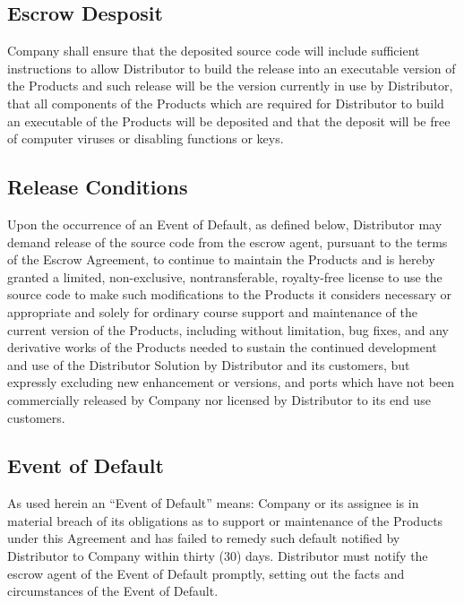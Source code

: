 \documentclass[letterpaper,10pt,english]{sphinxmanual}
\begin{document}
\subsection{Escrow Desposit}
\label{\detokenize{escrow:escrow-desposit}}
Company shall ensure that the deposited source code will include sufficient instructions to allow Distributor to build the release into an executable version of the Products and such release will be the version currently in use by Distributor, that all components of the Products which are required for Distributor to build an executable of the Products will be deposited and that the deposit will be free of computer viruses or disabling functions or keys.


\subsection{Release Conditions}
\label{\detokenize{escrow:release-conditions}}
Upon the occurrence of an Event of Default, as defined below, Distributor may demand release of the source code from the escrow agent, pursuant to the terms of the Escrow Agreement, to continue to maintain the Products and is hereby granted a limited, non-exclusive, nontransferable, royalty-free license to use the source code to make such modifications to the Products it considers necessary or appropriate and solely for ordinary course support and maintenance of the current version of the Products, including without limitation, bug fixes, and any derivative works of the Products needed to sustain the continued development and use of the Distributor Solution by Distributor and its customers, but expressly excluding new enhancement or versions,  and ports which have not been commercially released by Company nor licensed by Distributor to its end use customers.


\subsection{Event of Default}
\label{\detokenize{escrow:event-of-default}}
As used herein an “Event of Default” means: Company or its assignee is in material breach of its obligations as to support or maintenance of the Products under this Agreement and has failed to remedy such default notified by Distributor to Company within thirty (30) days.  Distributor must notify the escrow agent of the Event of Default promptly, setting out the facts and circumstances of the Event of Default.
\end{document}
